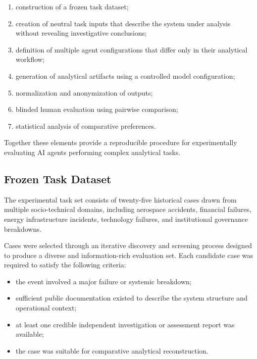 \begin{enumerate}

\item construction of a frozen task dataset;

\item creation of neutral task inputs that describe the system under
analysis without revealing investigative conclusions;

\item definition of multiple agent configurations that differ only in
their analytical workflow;

\item generation of analytical artifacts using a controlled model
configuration;

\item normalization and anonymization of outputs;

\item blinded human evaluation using pairwise comparison;

\item statistical analysis of comparative preferences.

\end{enumerate}

Together these elements provide a reproducible procedure for experimentally
evaluating AI agents performing complex analytical tasks.

\subsection{Frozen Task Dataset}

The experimental task set consists of twenty-five historical cases drawn
from multiple socio-technical domains, including aerospace accidents,
financial failures, energy infrastructure incidents, technology failures,
and institutional governance breakdowns.

Cases were selected through an iterative discovery and screening process
designed to produce a diverse and information-rich evaluation set. Each
candidate case was required to satisfy the following criteria:

\begin{itemize}

\item the event involved a major failure or systemic breakdown;

\item sufficient public documentation existed to describe the system
structure and operational context;

\item at least one credible independent investigation or assessment report
was available;

\item the case was suitable for comparative analytical reconstruction.

\end{itemize}

